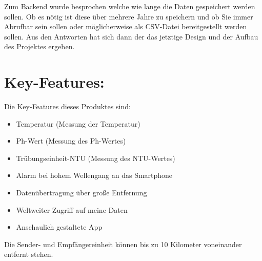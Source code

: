 Zum Backend wurde besprochen welche wie lange die Daten gespeichert werden sollen. Ob es nötig ist diese über mehrere Jahre zu speichern
und ob Sie immer Abrufbar sein sollen oder möglicherweise als CSV-Datei bereitgestellt werden sollen. 
Aus den Antworten hat sich dann der das jetztige Design und der Aufbau des Projektes ergeben.
\newpage
\section{Key-Features:}
Die Key-Features dieses Produktes sind:
\begin{itemize}
    \item Temperatur (Messung der Temperatur)
    \item Ph-Wert (Messung des Ph-Wertes)
    \item Trübungseinheit-NTU (Messung des NTU-Wertes) 
    \item Alarm bei hohem Wellengang an das Smartphone
    \item Datenübertragung über große Entfernung
    \item Weltweiter Zugriff auf meine Daten 
    \item Anschaulich gestaltete App
\end{itemize}
Die Sender- und Empfängereinheit können bis zu 10 Kilometer voneinander entfernt stehen. 

